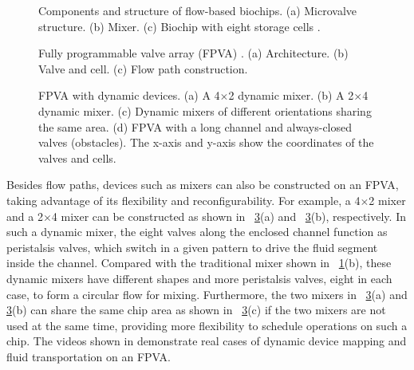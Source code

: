 \begin{figure}[t]
{\figurefontsize
\centering

\caption{Components and structure of flow-based biochips. (a) Microvalve structure. (b) Mixer. (c) Biochip with eight storage cells \cite{AminTA09}.}
\label{fig:valve_mixer_storage}
}
\end{figure}

\begin{figure}[t]
{\figurefontsize
\centering

\caption{Fully programmable valve array (FPVA) \cite{matrix11}.  (a) Architecture. (b) Valve and cell. (c) Flow path construction. }
\label{fig:archi}
}
\end{figure}

\begin{figure}[t]
{\figurefontsize
\centering

\caption{FPVA with dynamic devices. (a) A 4$\times$2 dynamic mixer.  (b) A 2$\times$4 dynamic mixer. (c) Dynamic mixers of different orientations sharing the same area. (d) FPVA with a long channel and always-closed valves (obstacles). The x-axis and y-axis show the coordinates of the valves and cells.}
\label{fig:dynamic_devices}
}
\end{figure}


Besides flow paths, devices such as mixers can also be constructed on 
an FPVA, taking advantage of its flexibility and reconfigurability.
For example, a 4$\times$2 mixer and a 2$\times$4 mixer can be constructed as
shown in 
\figname~\ref{fig:dynamic_devices}(a) and \figname~\ref{fig:dynamic_devices}(b),
respectively. In such a dynamic mixer, the eight valves along the enclosed channel 
function as peristalsis valves, which switch in a given pattern 
to drive the fluid segment inside the channel. Compared with the
traditional mixer shown in \figname~\ref{fig:valve_mixer_storage}(b), these dynamic
mixers have different shapes and more peristalsis valves, eight in each case, to
form a 
circular flow for mixing.
Furthermore, the two mixers in 
\figname~\ref{fig:dynamic_devices}(a) and \ref{fig:dynamic_devices}(b)
can share the same chip area as shown in \figname~\ref{fig:dynamic_devices}(c)
if the two mixers are not used at the same time, providing more
flexibility to schedule operations on such a chip.
The videos shown in \cite{PMD_mixing, PMD_transportation} demonstrate
real cases of dynamic device mapping and fluid transportation on an FPVA.

